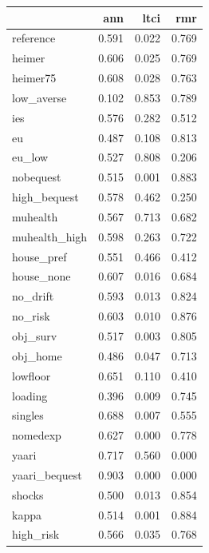 \begin{tabular}{lrrr}
\toprule
{} &    ann &   ltci &    rmr \\
\midrule
reference     &  0.591 &  0.022 &  0.769 \\
heimer        &  0.606 &  0.025 &  0.769 \\
heimer75      &  0.608 &  0.028 &  0.763 \\
low\_averse    &  0.102 &  0.853 &  0.789 \\
ies           &  0.576 &  0.282 &  0.512 \\
eu            &  0.487 &  0.108 &  0.813 \\
eu\_low        &  0.527 &  0.808 &  0.206 \\
nobequest     &  0.515 &  0.001 &  0.883 \\
high\_bequest  &  0.578 &  0.462 &  0.250 \\
muhealth      &  0.567 &  0.713 &  0.682 \\
muhealth\_high &  0.598 &  0.263 &  0.722 \\
house\_pref    &  0.551 &  0.466 &  0.412 \\
house\_none    &  0.607 &  0.016 &  0.684 \\
no\_drift      &  0.593 &  0.013 &  0.824 \\
no\_risk       &  0.603 &  0.010 &  0.876 \\
obj\_surv      &  0.517 &  0.003 &  0.805 \\
obj\_home      &  0.486 &  0.047 &  0.713 \\
lowfloor      &  0.651 &  0.110 &  0.410 \\
loading       &  0.396 &  0.009 &  0.745 \\
singles       &  0.688 &  0.007 &  0.555 \\
nomedexp      &  0.627 &  0.000 &  0.778 \\
yaari         &  0.717 &  0.560 &  0.000 \\
yaari\_bequest &  0.903 &  0.000 &  0.000 \\
shocks        &  0.500 &  0.013 &  0.854 \\
kappa         &  0.514 &  0.001 &  0.884 \\
high\_risk     &  0.566 &  0.035 &  0.768 \\
\bottomrule
\end{tabular}
